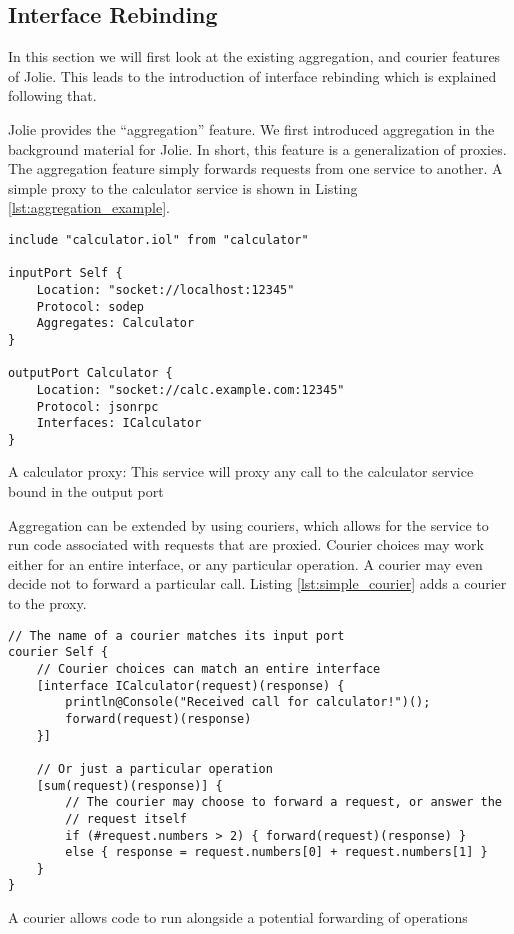 \subsection{Interface Rebinding}
\label{sec:interface_rebinding}

In this section we will first look at the existing aggregation, and courier
features of Jolie. This leads to the introduction of interface rebinding which
is explained following that.

Jolie provides the ``aggregation'' feature. We first introduced aggregation in
the background material for Jolie. In short, this feature is a generalization
of proxies. The aggregation feature simply forwards requests from one service
to another. A simple proxy to the calculator service is shown in Listing
\ref{lst:aggregation_example}.

\begin{listing}[H]
\begin{verbatim}
include "calculator.iol" from "calculator"

inputPort Self {
    Location: "socket://localhost:12345"
    Protocol: sodep
    Aggregates: Calculator
}

outputPort Calculator {
    Location: "socket://calc.example.com:12345"
    Protocol: jsonrpc
    Interfaces: ICalculator
}
\end{verbatim}

\caption{A calculator proxy: This service will proxy any call to the calculator
    service bound in the output port }

\label{lst:aggregation_example}

\end{listing}

Aggregation can be extended by using couriers, which allows for the service to
run code associated with requests that are proxied. Courier choices may work
either for an entire interface, or any particular operation. A courier may even
decide not to forward a particular call. Listing \ref{lst:simple_courier} adds
a courier to the proxy.

\begin{listing}[H]
\begin{verbatim}
// The name of a courier matches its input port
courier Self {
    // Courier choices can match an entire interface
    [interface ICalculator(request)(response) {
        println@Console("Received call for calculator!")();
        forward(request)(response)
    }]

    // Or just a particular operation
    [sum(request)(response)] {
        // The courier may choose to forward a request, or answer the
        // request itself
        if (#request.numbers > 2) { forward(request)(response) }
        else { response = request.numbers[0] + request.numbers[1] }
    }
}
\end{verbatim}

\caption{A courier allows code to run alongside a potential
    forwarding of operations}

\label{lst:simple_courier}

\end{listing}

